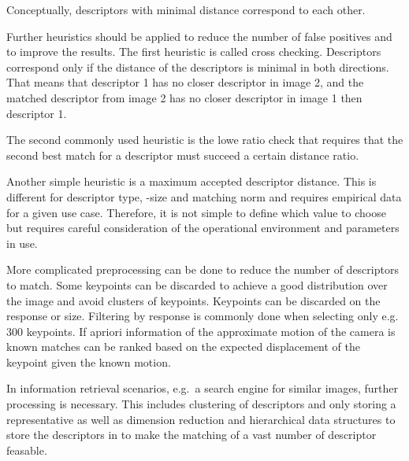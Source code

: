 Conceptually, descriptors with minimal distance correspond to each other.

Further heuristics should be applied to reduce the number of false positives and to improve the results.
The first heuristic is called cross checking. Descriptors correspond only if the distance of the descriptors is minimal in both directions.
That means that descriptor 1 has no closer descriptor in image 2, and the matched descriptor from image 2 has no closer descriptor in image 1 then descriptor 1.

The second commonly used heuristic is the lowe ratio check\cite{lowe_ijcv2004} that requires that the second best match for a descriptor must succeed a certain distance ratio.

Another simple heuristic is a maximum accepted descriptor distance.
This is different for descriptor type, -size and matching norm and requires empirical data for a given use case.
Therefore, it is not simple to define which value to choose but requires careful consideration of the operational environment and parameters in use.

More complicated preprocessing can be done to reduce the number of descriptors to match.
Some keypoints can be discarded to achieve a good distribution over the image and avoid clusters of keypoints.
Keypoints can be discarded on the response or size.
Filtering by response is commonly done when selecting only e.g. 300 keypoints.
If apriori information of the approximate motion of the camera is known matches can be ranked based on the expected displacement of the keypoint given the known motion.

In information retrieval scenarios, e.g.~a search engine for similar images, further processing is necessary.
This includes clustering of descriptors and only storing a representative as well as dimension reduction and hierarchical data structures to store the descriptors in to make the matching of a vast number of descriptor feasable.

